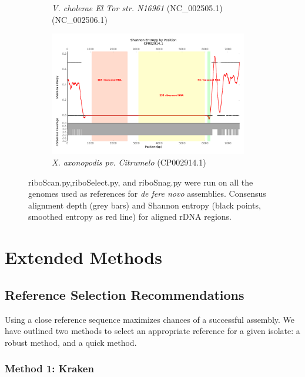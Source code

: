 \documentclass[10pt]{article}
\begin{document}
\begin{figure}
\begin{subfigure}[b]{.45\textwidth}
    \caption{\textit{V. cholerae El Tor str. N16961} (NC\_002505.1) (NC\_002506.1)}
    \label{fig:ent_vib}
  \end{subfigure}
  \begin{subfigure}[b]{.45\textwidth}
    \includegraphics[width=0.95\textwidth]{gage_entropy_figures/CP002914.1_entropy_plot}
    \caption{\textit{X. axonopodis pv. Citrumelo} (CP002914.1)}
  \end{subfigure}
  \caption{riboScan.py,riboSelect.py, and riboSnag.py were run on all the genomes used as references for \textit{de fere novo} assemblies. Consensus alignment depth (grey bars) and Shannon entropy (black points, smoothed entropy as red line) for aligned rDNA regions.}
  \label{fig:ent_gage}

\end{figure}

\pagebreak


\section*{Extended Methods}

\subsection*{Reference Selection Recommendations}
Using a close reference sequence maximizes chances of a successful assembly. We have outlined two methods to select an appropriate reference for a given isolate: a robust method, and a quick method.

\subsubsection*{Method 1: Kraken}
\end{document}
